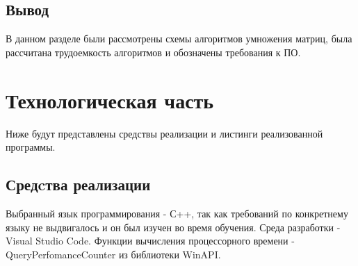 \documentclass{article}
\begin{document}
	\newpage
	\subsection{Вывод}
	В данном разделе были рассмотрены схемы алгоритмов умножения матриц, была рассчитана трудоемкость алгоритмов и обозначены требования к ПО.
	
	\newpage
	\section{Технологическая часть}
	Ниже будут представлены средствы реализации и листинги реализованной программы.
	\subsection{Средcтва реализации}
	Выбранный язык программирования - С++, так как требований по конкретнему языку не выдвигалось и он был изучен во время обучения. Среда разработки - Visual Studio Code.\cite{vs-code}
	\newline
	\indent Функции вычисления процессорного времени - QueryPerfomanceCounter из библиотеки WinAPI.\cite{winapi}
	
\end{document}
